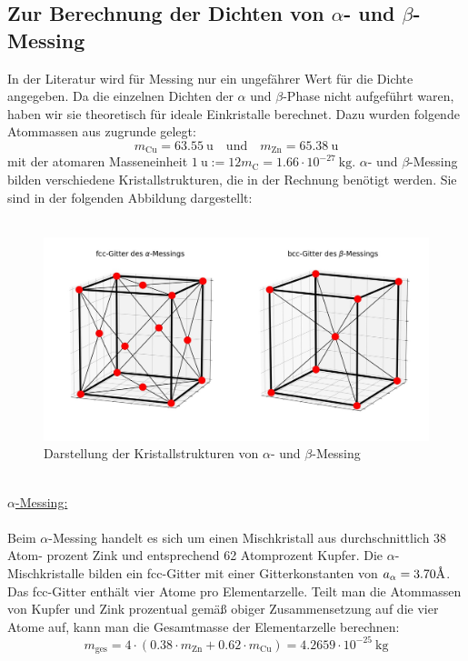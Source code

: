 \documentclass[german,  %
parskip=full,  %
]{scrartcl}
\begin{document}
\subsection{Zur Berechnung der Dichten von \(\alpha\)- und \(\beta\)-Messing}
In der Literatur wird für Messing nur ein ungefährer Wert für die Dichte angegeben. Da
die einzelnen Dichten der \(\alpha\) und \(\beta\)-Phase nicht aufgeführt waren, haben wir sie theoretisch für ideale Einkristalle berechnet. Dazu wurden folgende Atommassen aus \cite{Atommassen} zugrunde gelegt:
\[m_{\mathrm{Cu}} = 63.55 \ \mathrm{u} \quad\text{und}\quad m_{\mathrm{Zn}} = 65.38 \ \mathrm{u}\]
mit der atomaren Masseneinheit \(1 \ \mathrm{u} := 12m_{\mathrm{C}} = 1.66 \cdot 10^{-27} \  \mathrm{kg}\). \(\alpha\)- und \(\beta\)-Messing bilden verschiedene Kristallstrukturen, die in der Rechnung benötigt werden. Sie sind in der folgenden Abbildung dargestellt: \\\\
\begin{figure}[h!]\centering
\includegraphics[width = \textwidth]{alpha_und_beta_Messing_Gitter.jpg}
\caption{Darstellung der Kristallstrukturen von \(\alpha\)- und \(\beta\)-Messing}
\end{figure} \\
\underline{\(\alpha\)-Messing:} \\\\
Beim \(\alpha\)-Messing handelt es sich um einen Mischkristall aus durchschnittlich 38 Atom-
prozent Zink und entsprechend 62 Atomprozent Kupfer. Die \(\alpha\)-Mischkristalle bilden ein
fcc-Gitter mit einer Gitterkonstanten von \(a_{\alpha} = 3.70 \text{\r A}\). Das fcc-Gitter enthält vier Atome pro Elementarzelle. Teilt man die Atommassen von Kupfer und Zink prozentual gemäß
obiger Zusammensetzung auf die vier Atome auf, kann man die Gesamtmasse der Elementarzelle berechnen:
\[m_{\mathrm{ges}} = 4\cdot (0.38\cdot m_{\mathrm{Zn}} + 0.62 \cdot m_{\mathrm{Cu}}) = 4.2659 \cdot 10^{-25} \ \mathrm{kg}\]
\end{document}
